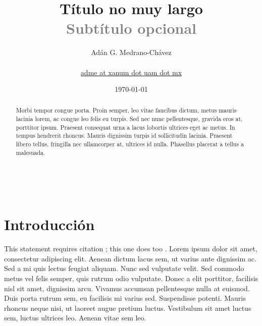 \documentclass[10pt]{article}
\title{
   \textcolor{Xoc}{{\textbf Título no muy largo}}\\ %
   \textcolor{gray}{\large Subtítulo opcional} %
}
\author{Adán G. Medrano-Chávez\\ %
        \\  %
        \href{mailto:adme@xanum.uam.mx}{adme at xanum dot uam dot mx}
}
\date{\today} %
\makeatletter
\renewcommand{\maketitle}{ %
\begin{flushright} %
{\LARGE\@title} %

\vspace{50pt} %

{\large\@author} %
\\\@date %

\vspace{40pt} %
\end{flushright}
}
\makeatother
\begin{document}
\maketitle %


\renewcommand{\abstractname}{Resumen} %
\renewcommand{\lstlistingname}{Código} %

\begin{abstract}
Morbi tempor congue porta. Proin semper, leo vitae faucibus dictum, metus mauris lacinia lorem, ac congue leo felis eu turpis. Sed nec nunc pellentesque, gravida eros at, porttitor ipsum. Praesent consequat urna a lacus lobortis ultrices eget ac metus. In tempus hendrerit rhoncus. Mauris dignissim turpis id sollicitudin lacinia. Praesent libero tellus, fringilla nec ullamcorper at, ultrices id nulla. Phasellus placerat a tellus a malesuada.
\end{abstract}


\vspace{30pt} %


\section{Introducción}

This statement requires citation \cite{HeJo03,HwEn05,MuMi07}; this one does too \cite{StWi13}. Lorem ipsum dolor sit amet, consectetur adipiscing elit. Aenean dictum lacus sem, ut varius ante dignissim ac. Sed a mi quis lectus feugiat aliquam. Nunc sed vulputate velit. Sed commodo metus vel felis semper, quis rutrum odio vulputate. Donec a elit porttitor, facilisis nisl sit amet, dignissim arcu. Vivamus accumsan pellentesque nulla at euismod. Duis porta rutrum sem, eu facilisis mi varius sed. Suspendisse potenti. Mauris rhoncus neque nisi, ut laoreet augue pretium luctus. Vestibulum sit amet luctus sem, luctus ultrices leo. Aenean vitae sem leo.
\end{document}
